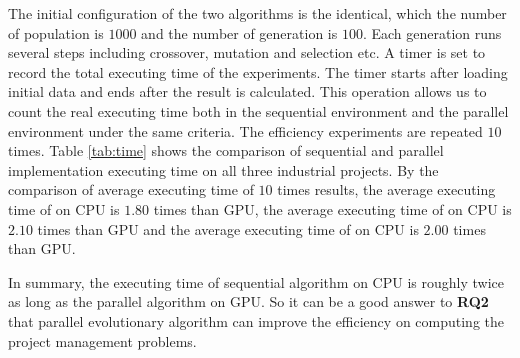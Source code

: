 The initial configuration of the two algorithms is the identical, which the
number of population is $1000$ and the number of generation is $100$. Each
generation runs several steps including crossover, mutation and selection etc. A
timer is set to record the total executing time of the experiments. The timer
starts after loading initial data and ends after the result is calculated. This
operation allows us to count the real executing time both in the sequential
environment and the parallel environment under the same criteria. The efficiency
experiments are repeated $10$ times. Table \ref{tab:time} shows the comparison
of sequential and parallel implementation executing time on all three industrial
projects. By the comparison of average executing time of $10$ times results, the
average executing time of \projectA{} on CPU is $1.80$ times than GPU, the
average executing time of \projectB{} on CPU is $2.10$ times than GPU and the
average executing time of \projectC{} on CPU is $2.00$ times than GPU.

In summary, the executing time of sequential algorithm on CPU is roughly twice
as long as the parallel algorithm on GPU. So it can be a good answer to
\textbf{RQ2} that parallel evolutionary algorithm can improve the efficiency on
computing the project management problems.






